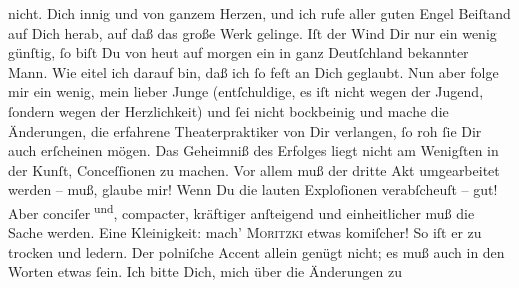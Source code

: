 \begin{ledgroupsized}[t]{13cm}
{{{                  nicht.}}}\label{K_L02675-2h} Dich innig und von ganzem Herzen, und ich rufe aller guten Engel
               Beiſtand auf Dich herab, auf daß das große Werk gelinge. Iſt der Wind Dir nur ein wenig günſtig, ſo biſt
               Du von heut auf morgen ein in ganz Deutſchland
               bekannter Mann. Wie eitel ich darauf bin, daß ich ſo feſt an Dich geglaubt. Nun aber
               folge mir ein wenig, mein lieber Junge (entſchuldige, es iſt nicht wegen der Jugend,
               ſondern {\pb}wegen der Herzlichkeit) und ſei nicht
               bockbeinig und mache die Änderungen, die erfahrene Theaterpraktiker von Dir verlangen, ſo roh
               ſie Dir auch erſcheinen mögen. Das Geheimniß des Erfolges liegt nicht am Wenigſten in
               der Kunſt, Conceſſionen zu machen. Vor allem muß der dritte Akt umgearbeitet werden – muß, glaube mir!
               Wenn Du die lauten Exploſionen verabſcheuſt – gut! Aber conciſer\substVorne{}\textsuperscript{{ }und}\substDazwischen{},\substHinten{} compacter, kräftiger anſteigend und einheitlicher muß die Sache werden. Eine
               Kleinigkeit: mach’ \textsc{Moritzki} etwas komiſcher! {\pb}So iſt er zu trocken und
               ledern. Der polniſche Accent allein genügt nicht;
               es muß auch in den Worten etwas ſein. Ich bitte Dich, mich über die Änderungen
                  \label{K_L02675-3v}\label{K_L02675-3h} zu

\end{ledgroupsized}
